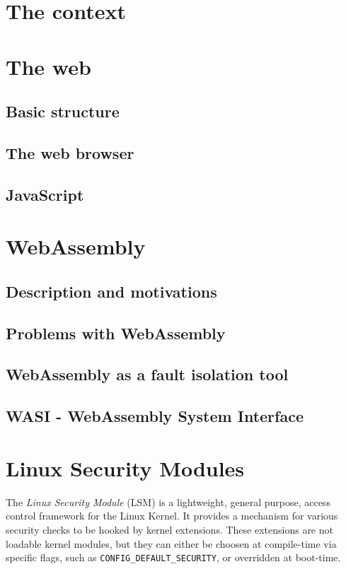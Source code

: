 \section{The context}

\section{The web}
\subsection{Basic structure}
\subsection{The web browser}
\subsection{JavaScript}

\section{WebAssembly}
\subsection{Description and motivations}
\subsection{Problems with WebAssembly}
\subsection{WebAssembly as a fault isolation tool}
\subsection{WASI - WebAssembly System Interface}

\section{Linux Security Modules}

The \textit{Linux Security Module} (LSM) \cite{lsm-2002} \cite{kernel-lsm}
is a lightweight, general purpose, access control framework for the Linux Kernel.
It provides a mechanism for various security checks to be hooked by kernel extensions.
These extensions are not loadable kernel modules, but they can either be choosen at
compile-time via specific flags, such as \texttt{CONFIG\_DEFAULT\_SECURITY}, or overridden at boot-time.

